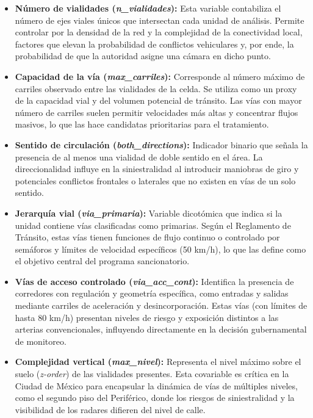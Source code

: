 \begin{itemize}
    \item \textbf{Número de vialidades (\textit{n\_vialidades}):} 
    Esta variable contabiliza el número de ejes viales únicos que intersectan cada unidad de análisis. Permite controlar por la densidad de la red y la complejidad de la conectividad local, factores que elevan la probabilidad de conflictos vehiculares y, por ende, la probabilidad de que la autoridad asigne una cámara en dicho punto.

    \item \textbf{Capacidad de la vía (\textit{max\_carriles}):} 
    Corresponde al número máximo de carriles observado entre las vialidades de la celda. Se utiliza como un proxy de la capacidad vial y del volumen potencial de tránsito. Las vías con mayor número de carriles suelen permitir velocidades más altas y concentrar flujos masivos, lo que las hace candidatas prioritarias para el tratamiento.

    \item \textbf{Sentido de circulación (\textit{both\_directions}):} 
    Indicador binario que señala la presencia de al menos una vialidad de doble sentido en el área. La direccionalidad influye en la siniestralidad al introducir maniobras de giro y potenciales conflictos frontales o laterales que no existen en vías de un solo sentido.

    \item \textbf{Jerarquía vial (\textit{via\_primaria}):} 
    Variable dicotómica que indica si la unidad contiene vías clasificadas como primarias. Según el Reglamento de Tránsito, estas vías tienen funciones de flujo continuo o controlado por semáforos y límites de velocidad específicos (50 km/h), lo que las define como el objetivo central del programa sancionatorio.

    \item \textbf{Vías de acceso controlado (\textit{via\_acc\_cont}):} 
    Identifica la presencia de corredores con regulación y geometría específica, como entradas y salidas mediante carriles de aceleración y desincorporación. Estas vías (con límites de hasta 80 km/h) presentan niveles de riesgo y exposición distintos a las arterias convencionales, influyendo directamente en la decisión gubernamental de monitoreo.

    \item \textbf{Complejidad vertical (\textit{max\_nivel}):} 
    Representa el nivel máximo sobre el suelo (\textit{z-order}) de las vialidades presentes. Esta covariable es crítica en la Ciudad de México para encapsular la dinámica de vías de múltiples niveles, como el segundo piso del Periférico, donde los riesgos de siniestralidad y la visibilidad de los radares difieren del nivel de calle.


\end{itemize}
